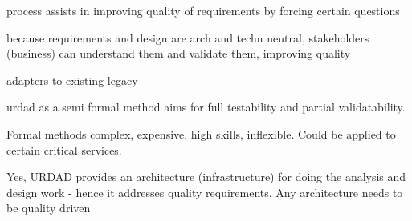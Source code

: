 process assists in improving quality of requirements by forcing certain questions

because requirements and design are arch and techn neutral, stakeholders (business) can understand them and validate them, improving quality

adapters to existing legacy

urdad as a semi formal method aims for full testability and partial validatability.

Formal methods complex, expensive, high skills, inflexible. Could be applied to certain critical services.

 
Yes, URDAD provides an architecture (infrastructure) for doing the analysis and design work - hence it addresses quality requirements. Any architecture needs to be quality driven